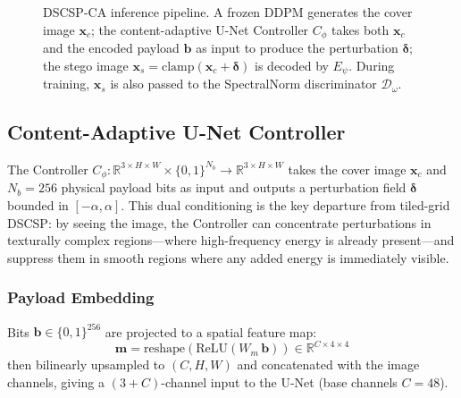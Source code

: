 \documentclass[journal]{IEEEtran}
\newcommand{\R}{\mathbb{R}}
\begin{document}
\begin{figure}[t]
\caption{DSCSP-CA inference pipeline. A frozen DDPM generates the cover image $\mathbf{x}_c$;
the content-adaptive U-Net Controller $C_\phi$ takes both $\mathbf{x}_c$ and the encoded
payload $\mathbf{b}$ as input to produce the perturbation $\bm{\delta}$; the stego image
$\mathbf{x}_s = \mathrm{clamp}(\mathbf{x}_c + \bm{\delta})$ is decoded by $E_\psi$.
During training, $\mathbf{x}_s$ is also passed to the SpectralNorm discriminator $\mathcal{D}_\omega$.}
\label{fig:architecture}
\end{figure}


\subsection{Content-Adaptive U-Net Controller}
\label{sec:controller}

The Controller $C_\phi:\R^{3\times H\times W}\times\{0,1\}^{N_b}\to\R^{3\times H\times W}$
takes the cover image $\mathbf{x}_c$ and $N_b=256$ physical payload bits as input and
outputs a perturbation field $\bm{\delta}$ bounded in $[-\alpha,\alpha]$.
This dual conditioning is the key departure from tiled-grid DSCSP: by seeing the image,
the Controller can concentrate perturbations in texturally complex regions---where high-frequency
energy is already present---and suppress them in smooth regions where any added energy is
immediately visible.

\subsubsection{Payload Embedding}
Bits $\mathbf{b}\in\{0,1\}^{256}$ are projected to a spatial feature map:
\begin{equation}
    \mathbf{m} = \mathrm{reshape}\!\left(\mathrm{ReLU}(W_m\,\mathbf{b})\right)\in\R^{C\times 4\times 4}
    \label{eq:msg_embed}
\end{equation}
then bilinearly upsampled to $(C,H,W)$ and concatenated with the image channels, giving a
$(3+C)$-channel input to the U-Net (base channels $C=48$).
\end{document}
